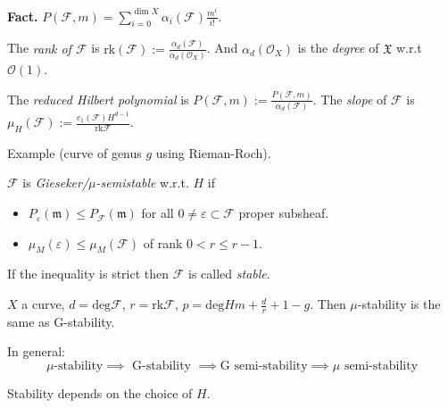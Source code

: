 {\bf Fact.} $P(\mathcal{F},m)=\sum_{i=0}^{\dim
X}\alpha_i(\mathcal{F})\frac{m^i}{i!}$.

The {\it rank of $\mathcal{F}$} is
$\text{rk}(\mathcal{F}):=\frac{\alpha_d(\mathcal{F})}{\alpha_d(\mathcal{O}_X)}$.
And $\alpha_d(\mathcal{O}_X)$ is the {\it degree} of $\mathfrak{X}$ w.r.t
$\mathcal{O}(1)$.

The {\it reduced Hilbert polynomial} is
$P(\mathcal{F},m):=\frac{P(\mathcal{F},m)}{\alpha_d(\mathcal{F})}$. The {\it
slope} of $\mathcal{F}$ is
$\mu_H(\mathcal{F}):=\frac{c_1(\mathcal{F})H^{d-1}}{\text{rk}\mathcal{F}}$.

Example (curve of genus $g$ using Rieman-Roch).

\begin{definition}
\label{definition-Gieseker-and-mu-stability}
$\mathcal{F}$ is {\it Gieseker/$\mu$-semistable} w.r.t. $H$ if
\begin{itemize}
\item $P_\varepsilon(\mathfrak{m})\leq P_{\mathcal{F}}(\mathfrak{m})$ for all $0
\neq  \varepsilon \subset \mathcal{F}$ proper subsheaf.
\item $\mu_{M}(\varepsilon) \leq  \mu_{M}(\mathcal{F})$ of rank $0<r \leq r-1$.
\end{itemize}
If the inequality is strict then $\mathcal{F}$ is called {\it stable}.
\end{definition}

\begin{example}
\label{example-G-and-mu-stability-coincide-in-curve}
$X$ a curve, $d=\text{deg}\mathcal{F}$, $r=\text{rk}\mathcal{F}$,
$p=\text{deg}Hm+\frac{d}{r}+1-g$. Then $\mu$-stability is the same as
G-stability.
\end{example}
In general:
$$
\mu\text{-stability}\implies \text{ G-stability }\implies \text{G semi-stability
}\implies \mu \text{ semi-stability}
$$
\begin{remark}
\label{remark-stability-depends-on-H}
Stability depends on the choice of $H$.
\end{remark}

